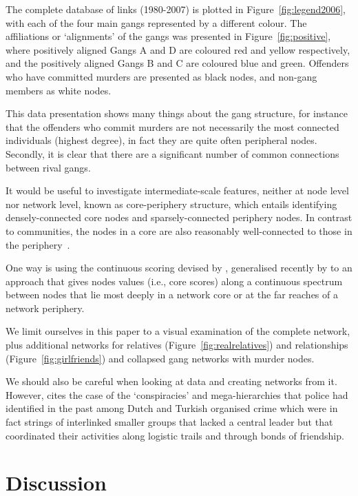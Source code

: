 \documentclass[twocolumn]{svjour3}          %
\theoremstyle{definition}
\begin{document}
The complete database of links (1980-2007) is plotted in
Figure~\ref{fig:legend2006}, with each of the four main gangs
represented by a different colour. The affiliations or `alignments' of
the gangs was presented in Figure~\ref{fig:positive}, where positively
aligned Gangs A and D are coloured red and yellow respectively, and
the positively aligned Gangs B and C are coloured blue and
green. Offenders who have committed murders are presented as black
nodes, and non-gang members as white nodes.

This data presentation shows many things about the gang structure, for
instance that the offenders who commit murders are not necessarily the
most connected individuals (highest degree), in fact they are quite
often peripheral nodes. Secondly, it is clear that there are a
significant number of common connections between rival gangs.

It would be useful to investigate intermediate-scale features, neither
at node level nor network level, known as core-periphery structure,
which entails identifying densely-connected core nodes and
sparsely-connected periphery nodes. In contrast to communities, the
nodes in a core are also reasonably well-connected to those in the
periphery~\citep{rombach-et-al:2014}.

One way is using the continuous scoring devised by
\citet{borgatti+everett:2000}, generalised recently by
\citet{rombach-et-al:2014} to an approach that gives nodes values
(i.e., core scores) along a continuous spectrum between nodes that lie
most deeply in a network core or at the far reaches of a network
periphery.

We limit ourselves in this paper to a visual examination of the
complete network, plus additional networks for relatives
(Figure~\ref{fig:realrelatives}) and relationships
(Figure~\ref{fig:girlfriends}) and collapsed gang networks with murder
nodes.

We should also be careful when looking at data and creating networks
from it. However, \citet{Klerks2001} cites the case of the
`conspiracies' and mega-hierarchies that police had identified in the
past among Dutch and Turkish organised crime which were in fact
strings of interlinked smaller groups that lacked a central leader but
that coordinated their activities along logistic trails and through
bonds of friendship.

\section{Discussion}\label{sec:discussion}
\end{document}
